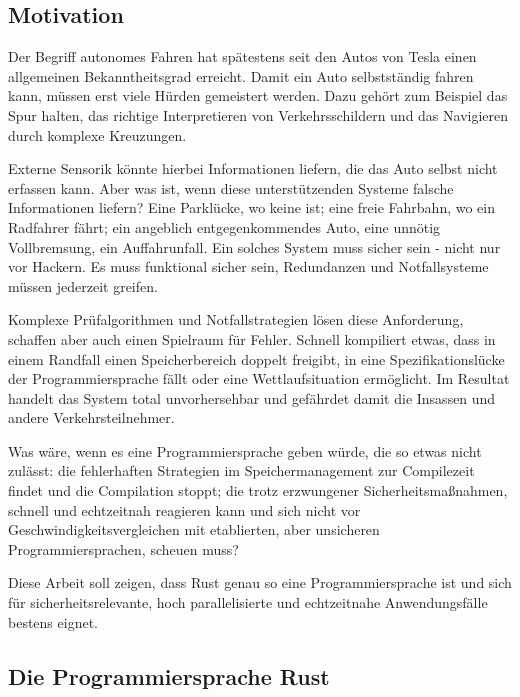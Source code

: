 \begin{multicols}{2}

\subsection*{Motivation}

Der Begriff autonomes Fahren hat spätestens seit den Autos von Tesla einen allgemeinen Bekanntheitsgrad erreicht. Damit ein Auto selbstständig fahren kann, müssen erst viele Hürden gemeistert werden.
Dazu gehört zum Beispiel das Spur halten, das richtige Interpretieren von Verkehrsschildern und das Navigieren durch komplexe Kreuzungen.

Externe Sensorik könnte hierbei Informationen liefern, die das Auto selbst nicht erfassen kann.
Aber was ist, wenn diese unterstützenden Systeme falsche Informationen liefern?
Eine Parklücke, wo keine ist; eine freie Fahrbahn, wo ein Radfahrer fährt; ein angeblich entgegenkommendes Auto, eine unnötig Vollbremsung, ein Auffahrunfall.
Ein solches System muss sicher sein - nicht nur vor Hackern.
Es muss funktional sicher sein, Redundanzen und Notfallsysteme müssen jederzeit greifen.

Komplexe Prüfalgorithmen und Notfallstrategien lösen diese Anforderung, schaffen aber auch einen Spielraum für Fehler.
Schnell kompiliert etwas, dass in einem Randfall einen Speicherbereich doppelt freigibt, in eine Spezifikationslücke der Programmiersprache fällt oder eine Wettlaufsituation ermöglicht.
Im Resultat handelt das System total unvorhersehbar und gefährdet damit die Insassen und andere Verkehrsteilnehmer.

Was wäre, wenn es eine Programmiersprache geben würde, die so etwas nicht zulässt: die fehlerhaften Strategien im Speichermanagement zur Compilezeit findet und die Compilation stoppt; die trotz erzwungener Sicherheitsmaßnahmen, schnell und echtzeitnah reagieren kann und sich nicht vor Geschwindigkeitsvergleichen mit etablierten, aber unsicheren Programmiersprachen, scheuen muss?

Diese Arbeit soll zeigen, dass Rust genau so eine Programmiersprache ist und sich für sicherheitsrelevante, hoch parallelisierte und echtzeitnahe Anwendungsfälle bestens eignet.

\subsection*{Die Programmiersprache Rust}


\end{multicols}
